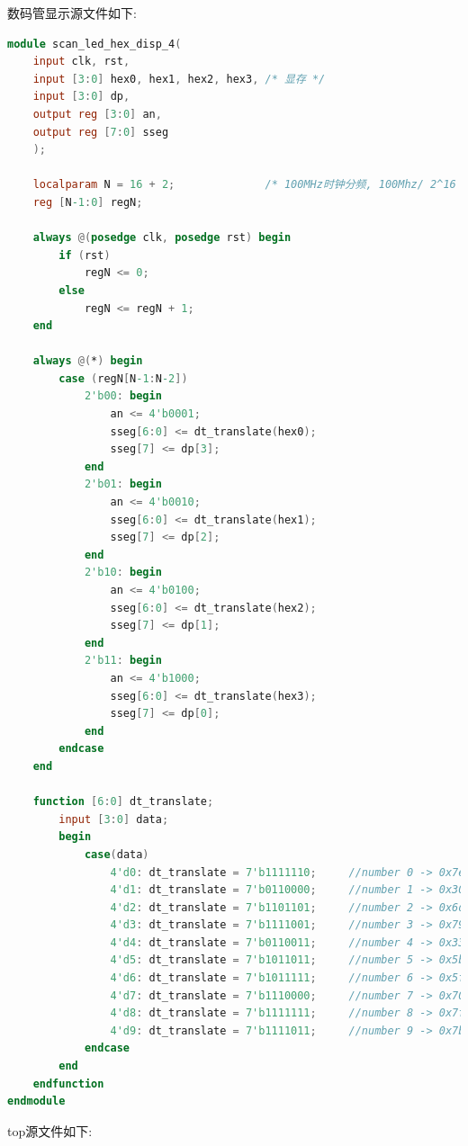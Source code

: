 \documentclass{article}
\begin{document}
数码管显示源文件如下:
\begin{lstlisting}[language=Verilog, caption={数码管显示源文件}]
module scan_led_hex_disp_4(
    input clk, rst,
    input [3:0] hex0, hex1, hex2, hex3, /* 显存 */
    input [3:0] dp,
    output reg [3:0] an,
    output reg [7:0] sseg
    );

    localparam N = 16 + 2;              /* 100MHz时钟分频, 100Mhz/ 2^16 */         
    reg [N-1:0] regN;

    always @(posedge clk, posedge rst) begin
        if (rst)
            regN <= 0;
        else 
            regN <= regN + 1;
    end

    always @(*) begin
        case (regN[N-1:N-2])
            2'b00: begin
                an <= 4'b0001;
                sseg[6:0] <= dt_translate(hex0);
                sseg[7] <= dp[3];
            end
            2'b01: begin
                an <= 4'b0010;
                sseg[6:0] <= dt_translate(hex1);
                sseg[7] <= dp[2];
            end
            2'b10: begin
                an <= 4'b0100;
                sseg[6:0] <= dt_translate(hex2);
                sseg[7] <= dp[1];
            end
            2'b11: begin
                an <= 4'b1000;
                sseg[6:0] <= dt_translate(hex3);
                sseg[7] <= dp[0];
            end 
        endcase
    end

    function [6:0] dt_translate;
        input [3:0] data;
        begin
            case(data)
                4'd0: dt_translate = 7'b1111110;     //number 0 -> 0x7e
                4'd1: dt_translate = 7'b0110000;     //number 1 -> 0x30
                4'd2: dt_translate = 7'b1101101;     //number 2 -> 0x6d
                4'd3: dt_translate = 7'b1111001;     //number 3 -> 0x79
                4'd4: dt_translate = 7'b0110011;     //number 4 -> 0x33
                4'd5: dt_translate = 7'b1011011;     //number 5 -> 0x5b
                4'd6: dt_translate = 7'b1011111;     //number 6 -> 0x5f
                4'd7: dt_translate = 7'b1110000;     //number 7 -> 0x70
                4'd8: dt_translate = 7'b1111111;     //number 8 -> 0x7f
                4'd9: dt_translate = 7'b1111011;     //number 9 -> 0x7b
            endcase
        end
    endfunction
endmodule
\end{lstlisting}
top源文件如下:
\end{document}

